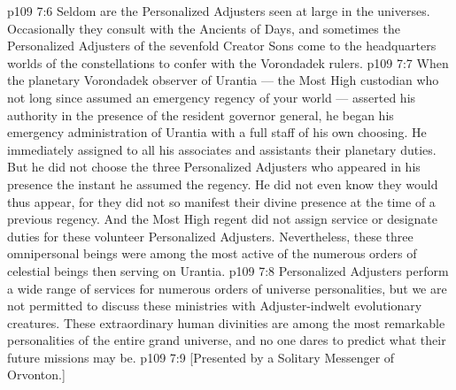 \vs p109 7:6 Seldom are the Personalized Adjusters seen at large in the universes. Occasionally they consult with the Ancients of Days, and sometimes the Personalized Adjusters of the sevenfold Creator Sons come to the headquarters worlds of the constellations to confer with the Vorondadek rulers.
\vs p109 7:7 \pc When the planetary Vorondadek observer of Urantia --- the Most High custodian who not long since assumed an emergency regency of your world --- asserted his authority in the presence of the resident governor general, he began his emergency administration of Urantia with a full staff of his own choosing. He immediately assigned to all his associates and assistants their planetary duties. But he did not choose the three Personalized Adjusters who appeared in his presence the instant he assumed the regency. He did not even know they would thus appear, for they did not so manifest their divine presence at the time of a previous regency. And the Most High regent did not assign service or designate duties for these volunteer Personalized Adjusters. Nevertheless, these three omnipersonal beings were among the most active of the numerous orders of celestial beings then serving on Urantia.
\vs p109 7:8 \pc Personalized Adjusters perform a wide range of services for numerous orders of universe personalities, but we are not permitted to discuss these ministries with Adjuster\hyp{}indwelt evolutionary creatures. These extraordinary human divinities are among the most remarkable personalities of the entire grand universe, and no one dares to predict what their future missions may be.
\vsetoff
\vs p109 7:9 [Presented by a Solitary Messenger of Orvonton.]
\quizlink
